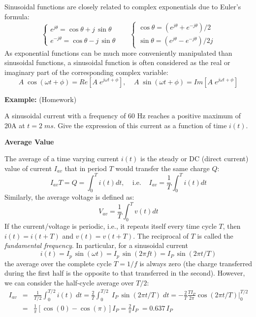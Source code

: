 \documentclass{article}
\begin{document}
Sinusoidal functions are closely related to complex exponentials due
to Euler's formula:
\begin{equation}
  \left\{ \begin{array}{l}
    e^{ j\theta}=\cos\theta+j\,\sin\theta\\
    e^{-j\theta}=\cos\theta-j\,\sin\theta \end{array} \right.
  \;\;\;\;\;\;
  \left\{ \begin{array}{l}
    \cos\theta=(e^{j\theta}+e^{-j\theta})/2\\
    \sin\theta=(e^{j\theta}-e^{-j\theta})/2j 
  \end{array} \right.  
\end{equation}
As exponential functions can be much more conveniently manipulated 
than sinusoidal functions, a sinusoidal function is often considered
as the real or imaginary part of the corresponding complex variable:
\begin{equation}
  A\;\cos(\omega t+\phi)=Re[A\;e^{j\omega t+\phi}],\;\;\;\;
  A\;\sin(\omega t+\phi)=Im[A\;e^{j\omega t+\phi}]	
\end{equation}


{\bf Example:} (Homework)

A sinusoidal current with a frequency of 60 Hz reaches a positive
maximum of 20A at $t=2 \; ms$. Give the expression of this current 
as a function of time $i(t)$.


{\bf Average Value} 

The average of a time varying current $i(t)$ is the steady or DC 
(direct current) value of current $I_{av}$ that in period $T$ would 
transfer the same charge $Q$:
\begin{equation}	
  I_{av}T=Q=\int_0^T i(t) dt,\;\;\;\;\mbox{i.e.}\;\;\;\;
  I_{av}=\frac{1}{T}\int_0^T i(t) dt	
\end{equation}
Similarly, the average voltage is defined as:
\begin{equation}
  V_{av}=\frac{1}{T}\int_0^T v(t) dt	
\end{equation}
If the current/voltage is periodic, i.e., it repeats itself every 
time cycle $T$, then $i(t)=i(t+T)$ and $v(t)=v(t+T)$. The reciprocal 
of $T$ is called the {\em fundamental frequency}. In particular, for 
a sinusoidal current 
\begin{equation}
  i(t)=I_p\,\sin(\omega t)=I_p\,\sin(2\pi ft)=I_P\,\sin(2\pi t/T)
\end{equation}
the average over the complete cycle $T=1/f$ is always zero (the charge
transferred during the first half is the opposite to that transferred
in the second). However, we can consider the half-cycle average over 
$T/2$:
\begin{eqnarray} 
  I_{av}&=&\frac{1}{T/2}\int_0^{T/2} i(t)\; dt
  =\frac{2}{T}\int_0^{T/2} \;I_P\,\sin(2\pi t/T)\;dt	
  =-\frac{2}{T}\frac{TI_P}{2\pi} \cos(2\pi t/T)\bigg|_0^{T/2}
  \nonumber \\
  &=& \frac{1}{\pi}\left[\cos(0)-\cos(\pi)\right]I_P
  =\frac{2}{\pi}I_P\;=0.637\,I_P
\end{eqnarray}
\end{document}

